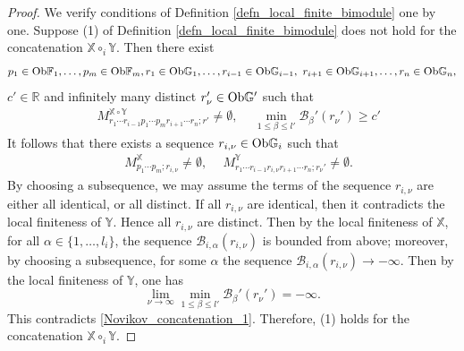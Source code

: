 \documentclass[reqno, 10pt]{amsart}
\numberwithin{equation}{section}
\numberwithin{equation}{section}
\theoremstyle{definition}
\theoremstyle{remark}
\newcommand{\beqn}{\begin{equation*}}
\newcommand{\eeqn}{\end{equation*}}
\newcommand{\mb}{\mathbb}
\newcommand{\mc}{\mathcal}
\begin{document}
\begin{proof}
We verify conditions of Definition \ref{defn_local_finite_bimodule} one by one. Suppose (1) of Definition \ref{defn_local_finite_bimodule} does not hold for the concatenation ${\mb X} \circ_i {\mb Y}$. Then there exist 
\beqn
p_1 \in {\rm Ob}{\mb F}_1, \ldots, p_m \in {\rm Ob}{\mb F}_m, r_1 \in {\rm Ob}{\mb G}_1, \ldots, r_{i-1} \in {\rm Ob}{\mb G}_{i-1},\ r_{i+1} \in {\rm Ob}{\mb G}_{i+1}, \ldots, r_n \in {\rm Ob}{\mb G}_n,
\eeqn
$c' \in {\mb R}$ and infinitely many distinct $r_\nu'\in {\rm Ob}{\mb G}'$ such that 
\begin{align}\label{Novikov_concatenation_1}
&\ M_{r_1 \cdots r_{i-1} p_1 \cdots p_m r_{i+1} \cdots r_n; r'}^{{\mb X} \circ {\mb Y} } \neq \emptyset,\ &\ \min_{1 \leq \beta \leq l'} {\mc B}_\beta'(r_\nu') \geq c'
\end{align}
It follows that there exists a sequence $r_{i, \nu} \in {\rm Ob}{\mb G}_i$ such that 
\begin{align*}
&\ M_{p_1 \cdots p_m; r_{i,\nu}}^{\mb X} \neq \emptyset,\ &\ M_{r_1 \cdots r_{i-1} r_{i, \nu} r_{i+1} \cdots r_n; r_\nu'}^{\mb Y} \neq \emptyset.
\end{align*}
By choosing a subsequence, we may assume the terms of the sequence $r_{i, \nu}$ are either all identical, or all distinct. If all $r_{i, \nu}$ are identical, then it contradicts the local finiteness of ${\mb Y}$. Hence all $r_{i, \nu}$ are distinct. Then by the local finiteness of ${\mb X}$, for all $\alpha\in \{1, \ldots, l_i\}$, the sequence ${\mc B}_{i, \alpha}(r_{i, \nu})$ is bounded from above; moreover, by choosing a subsequence, for some $\alpha$ the sequence ${\mc B}_{i,\alpha}(r_{i,\nu}) \to -\infty$. Then by the local finiteness of ${\mb Y}$, one has
\beqn
\lim_{\nu \to \infty} \min_{1 \leq \beta \leq l'} {\mc B}_\beta'(r_\nu') = -\infty.
\eeqn
This contradicts \eqref{Novikov_concatenation_1}. Therefore, (1) holds for the concatenation ${\mb X} \circ_i {\mb Y}$. 


\end{proof}
\end{document}
